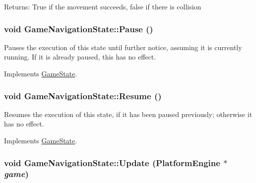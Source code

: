 \begin{Desc}
\item[Returns:]True if the movement succeeds, false if there is collision \end{Desc}
\hypertarget{class_game_navigation_state_ac626b511de8af9f32b7a1492a10f861}{
\subsubsection[{Pause}]{\setlength{\rightskip}{0pt plus 5cm}void GameNavigationState::Pause ()}}
\label{de/d2a/class_game_navigation_state_ac626b511de8af9f32b7a1492a10f861}


Pauses the execution of this state until further notice, assuming it is currently running. If it is already paused, this has no effect. 

Implements \hyperlink{class_game_state_1f4d2b5a2e4dcb7645e3e7a5735926a6}{GameState}.\hypertarget{class_game_navigation_state_4d6aee55eddb1978f493206d985fb950}{
\subsubsection[{Resume}]{\setlength{\rightskip}{0pt plus 5cm}void GameNavigationState::Resume ()}}
\label{de/d2a/class_game_navigation_state_4d6aee55eddb1978f493206d985fb950}


Resumes the execution of this state, if it has been paused previously; otherwise it has no effect. 

Implements \hyperlink{class_game_state_cf9bcd5b47ebb3f572389f64c5ca5ed4}{GameState}.\hypertarget{class_game_navigation_state_90f5e6d6287a875d8f2737180f46a004}{
\subsubsection[{Update}]{\setlength{\rightskip}{0pt plus 5cm}void GameNavigationState::Update ({\bf PlatformEngine} $\ast$ {\em game})}}
\label{de/d2a/class_game_navigation_state_90f5e6d6287a875d8f2737180f46a004}


